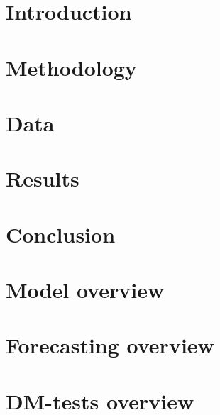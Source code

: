 \documentclass[a4paper,11pt]{report}
\begin{document}


\tableofcontents
\newpage

\chapter{Introduction}
\label{chap:introduction}


\chapter{Methodology}
\label{chap:methodology}


\chapter{Data}
\label{chap:data}


\chapter{Results}
\label{chap:results}


\chapter{Conclusion}
\label{chap:conclusion}


\appendix
\chapter{Model overview}
\label{chap:model-overview}


\chapter{Forecasting overview}
\label{chap:forecasting-overview}


\chapter{DM-tests overview}
\label{chap:dmtest-overview}


\printbibliography
\end{document}
